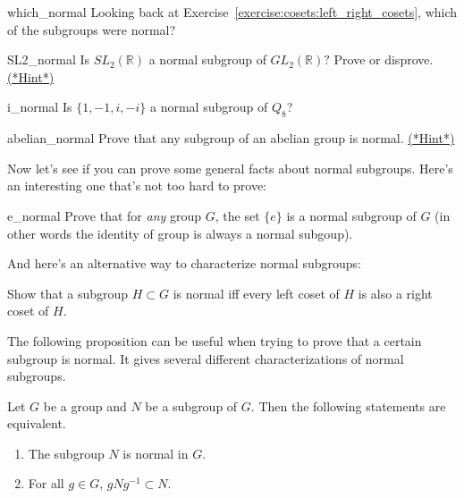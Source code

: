 {\begin{exercise}{which_normal}
Looking back at Exercise~\ref{exercise:cosets:left_right_cosets}, which of the subgroups were normal?
\end{exercise}

\begin{exercise}{SL2_normal}
Is $SL_2( {\mathbb R} )$ a normal subgroup of $GL_2( {\mathbb R})?$  Prove or disprove.
\hyperref[sec:cosets:hints]{(*Hint*)}
\end{exercise}

\begin{exercise}{i_normal}
Is  $\{ 1, -1, i, -i \}$ a normal subgroup of $Q_8$?
\end{exercise}

\begin{exercise}{abelian_normal} Prove that any subgroup of an abelian group is normal.
\hyperref[sec:cosets:hints]{(*Hint*)}
\end{exercise}

Now let's see if you can prove some general facts about normal subgroups.  Here's an interesting one that's not too hard to prove:

\begin{exercise}{e_normal}
Prove that for \emph{any} group $G$, the set $\{e\}$ is a normal subgroup of $G$ (in other words the identity of group is always a normal subgoup).
\end{exercise} 

And here's an alternative way to characterize normal subgroups:

\begin{exercise}{}
Show that a subgroup $H \subset G$ is normal iff every left coset of $H$ is also a right coset of $H$.
\end{exercise}

The following proposition can be useful when trying to prove that a certain subgroup is normal.  It gives several different characterizations of normal subgroups.
  
\begin{thm}\label{normal:normalequivalents}
Let $G$ be a group and $N$ be a subgroup of $G$. Then the following
statements are equivalent.
\begin{enumerate}
 
\item
The subgroup $N$ is normal in $G$. 
 
\item
For all $g \in G$, $gNg^{-1} \subset N$. 
 

\end{enumerate}
\end{thm}}
